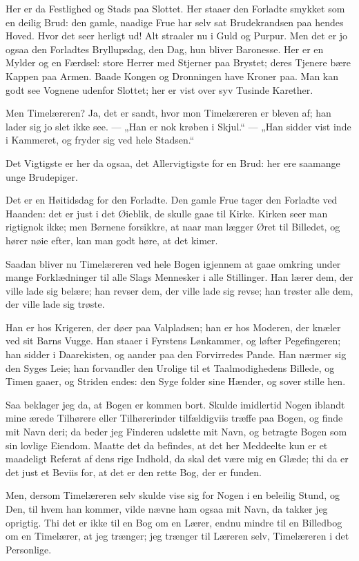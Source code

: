 \documentclass[12pt,a4paper]{book}
\newcommand{\apage}[1]{\marginnote{\footnotesize\textit{[#1]}}}
\begin{document}
Her er da Festlighed og Stads paa Slottet. Her staaer den Forladte
smykket som en deilig Brud: den gamle, naadige Frue har selv sat
Brudekrandsen paa hendes Hoved. Hvor det seer herligt ud! Alt
straaler nu i Guld og Purpur. Men det er jo ogsaa den Forladtes
Bryllupsdag, den Dag, hun bliver Baronesse. Her er en Mylder og en
Færdsel: store Herrer med Stjerner paa Brystet; deres Tjenere bære
Kappen paa Armen. Baade Kongen og Dronningen have Kroner paa. Man
kan godt see Vognene udenfor Slottet; her er vist over syv Tusinde
Karether.

Men Timelæreren? Ja, det er sandt, hvor mon Timelæreren er bleven
af; han lader sig jo slet ikke see. --- „Han er nok krøben i
Skjul.“ --- „Han sidder vist inde i Kammeret, og fryder sig ved
hele Stadsen.“

Det Vigtigste er her da ogsaa, det Allervigtigste for en Brud: her
ere saamange unge Brudepiger.

Det er en Høitidsdag for den Forladte. Den gamle Frue tager den
Forladte ved Haanden: det er just i det Øieblik, de skulle gaae til
Kirke. Kirken seer man rigtignok ikke; men Børnene forsikkre, at
naar man lægger Øret til Billedet, og hører nøie efter, kan man
godt høre, at det kimer.

Saadan bliver nu Timelæreren ved hele Bogen igjennem at gaae
omkring under mange Forklædninger til alle Slags
Mennesker i alle Stillinger. Han lærer dem, der ville \apage{92} lade sig
belære; han revser dem, der ville lade sig revse; han trøster alle
dem, der ville lade sig trøste.

Han er hos Krigeren, der døer paa Valpladsen; han er hos Moderen,
der knæler ved sit Barns Vugge. Han staaer i Fyrstens Lønkammer, og
løfter Pegefingeren; han sidder i Daarekisten, og aander paa den
Forvirredes Pande. Han nærmer sig den Syges Leie; han forvandler
den Urolige til et Taalmodighedens Billede, og Timen gaaer, og
Striden endes: den Syge folder sine Hænder, og sover stille hen.

Saa beklager jeg da, at Bogen er kommen bort. Skulde imidlertid
Nogen iblandt mine ærede Tilhørere eller Tilhørerinder tilfældigviis
træffe paa Bogen, og finde mit Navn deri; da beder jeg Finderen
udslette mit Navn, og betragte Bogen som sin lovlige Eiendom.
Maatte det da befindes, at det her Meddeelte kun er et maadeligt
Referat af dens rige Indhold, da skal det være mig en Glæde; thi
da er det just et Beviis for, at det er den rette Bog, der er
funden.

Men, dersom Timelæreren selv skulde vise sig for Nogen i en
beleilig Stund, og Den, til hvem han kommer, vilde nævne ham ogsaa
mit Navn, da takker jeg oprigtig. Thi det er ikke til en Bog om en
Lærer, endnu mindre til en Billedbog om en Timelærer, at jeg
trænger; jeg trænger til Læreren selv, Timelæreren i det
Personlige.
\end{document}
